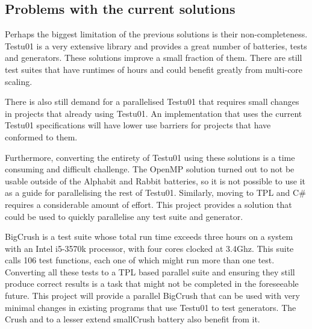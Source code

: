 \subsection{Problems with the current solutions}
Perhaps the biggest limitation of the previous solutions is their non-completeness. Testu01 is a very extensive library and provides a great number of batteries, tests and generators. These solutions improve a small fraction of them. There are still test suites that have runtimes of hours and could benefit greatly from multi-core scaling.

There is also still demand for a parallelised Testu01 that requires small changes in projects that already using Testu01. An implementation that uses the current  Testu01 specifications will have lower use barriers for projects that have conformed to them.

Furthermore, converting the entirety of Testu01 using these solutions is a time consuming and difficult challenge. The OpenMP solution turned out to not be usable outside of the Alphabit and Rabbit batteries, so it is not possible to use it as a guide for parallelising the rest of Testu01. Similarly, moving to TPL and C\# requires a considerable amount of effort. This project provides a solution that could be used to quickly parallelise any test suite and generator.

BigCrush is a test suite whose total run time exceeds three hours on a system with an Intel i5-3570k processor, with four cores clocked at 3.4Ghz. This suite calls 106 test functions, each one of which might run more than one test. Converting all these tests to a TPL based parallel suite and ensuring they still produce correct results is a task that might not be completed in the foreseeable future. This project will provide a parallel BigCrush that can be used with very minimal changes in existing programs that use Testu01 to test generators. The Crush and to a lesser extend smallCrush battery also benefit from it.
